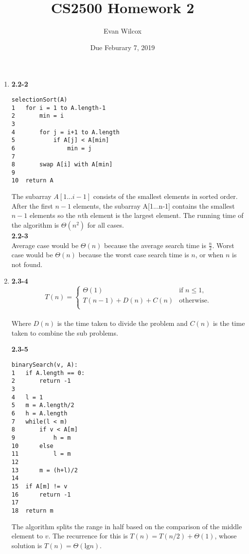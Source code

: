 \documentclass[a4paper]{article}
\title{CS2500 Homework 2}
\author{Evan Wilcox}
\date{Due Feburary 7, 2019}
\begin{document}
    \maketitle

    \begin{enumerate}

        \item 
        \textbf{2.2-2}
        \begin{verbatim}
selectionSort(A)
1   for i = 1 to A.length-1
2       min = i
3    
4       for j = i+1 to A.length
5           if A[j] < A[min]
6               min = j
7   
8       swap A[i] with A[min]
9
10  return A\end{verbatim}
        
        The subarray $A[1...i-1]$ consists of the smallest elements in sorted order. 
        After the first $n-1$ elements, the subarray A[1...n-1] contains the smallest 
        $n-1$ elements so the $n$th element is the largest element.
        The running time of the algorithm is $\Theta(n^{2})$ for all cases.\\
        

        \textbf{2.2-3}\\
        Average case would be $\Theta(n)$ because the average search time is 
        $\frac{n}{2}$. Worst case would be $\Theta(n)$ because the worst case 
        search time is $n$, or when $n$ is not found.\\
        
        \item
        \textbf{2.3-4}\\
        \[ T(n)=\begin{cases} 
            \Theta(1) & \text{if } n \leq 1, \\
            T(n-1) + D(n) + C(n) & \text{otherwise}. \\
         \end{cases}
        \]\\

         Where $D(n)$ is the time taken to divide the problem and $C(n)$ is the time 
         taken to combine the sub problems.

        \newpage
        \textbf{2.3-5}
         \begin{verbatim}
binarySearch(v, A):
1   if A.length == 0:
2       return -1
3
4   l = 1
5   m = A.length/2
6   h = A.length
7   while(l < m)
8       if v < A[m]
9           h = m
10      else
11          l = m
12          
13      m = (h+l)/2
14
15  if A[m] != v
16      return -1
17
18  return m\end{verbatim}
        The algorithm splits the range in half based on the comparison of the 
        middle element to $v$. The recurrence for this is 
        $T(n) = T(n/2) + \Theta(1)$, whose solution is $T(n) = \Theta(\text{lg}n)$.\\


\end{enumerate}
\end{document}
